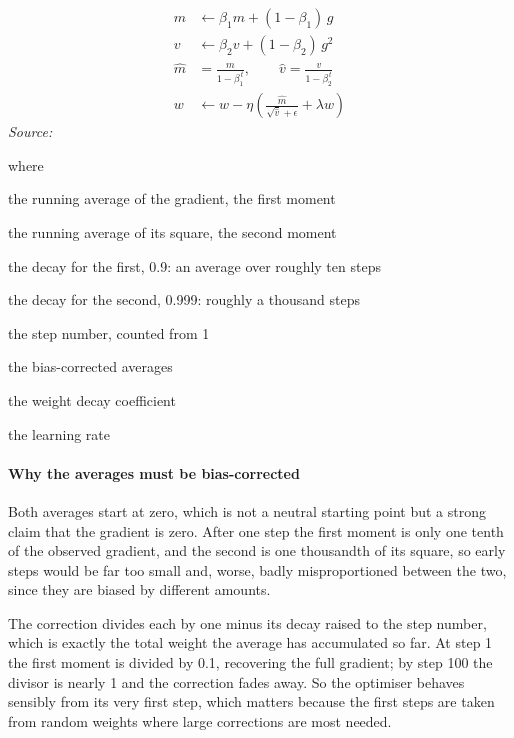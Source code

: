 \begin{equation}
\begin{aligned} m &\leftarrow \beta_1 m + (1-\beta_1)\,g \\[2pt] v &\leftarrow \beta_2 v + (1-\beta_2)\,g^2 \\[2pt] \hat{m} &= \frac{m}{1-\beta_1^{\,t}}, \qquad \hat{v} = \frac{v}{1-\beta_2^{\,t}} \\[2pt] w &\leftarrow w - \eta\left(\frac{\hat{m}}{\sqrt{\hat{v}}+\epsilon} + \lambda w\right) \end{aligned}
\end{equation}
\noindent\emph{Source: }\cite{kingma2015}


\noindent where
\begin{description}[leftmargin=2.4em,style=nextline,font=\normalfont\ttfamily]\setlength\itemsep{1pt}
  \item[{$m$}] \normalfont the running average of the gradient, the first moment
  \item[{$v$}] \normalfont the running average of its square, the second moment
  \item[{$\beta_1$}] \normalfont the decay for the first, 0.9: an average over roughly ten steps
  \item[{$\beta_2$}] \normalfont the decay for the second, 0.999: roughly a thousand steps
  \item[{$t$}] \normalfont the step number, counted from 1
  \item[{$\hat{m},\,\hat{v}$}] \normalfont the bias-corrected averages
  \item[{$\lambda$}] \normalfont the weight decay coefficient
  \item[{$\eta$}] \normalfont the learning rate
\end{description}

\paragraph{Why the averages must be bias-corrected}
Both averages start at zero, which is not a neutral starting point but a strong claim that the gradient is zero. After one step the first moment is only one tenth of the observed gradient, and the second is one thousandth of its square, so early steps would be far too small and, worse, badly misproportioned between the two, since they are biased by different amounts.

The correction divides each by one minus its decay raised to the step number, which is exactly the total weight the average has accumulated so far. At step 1 the first moment is divided by 0.1, recovering the full gradient; by step 100 the divisor is nearly 1 and the correction fades away. So the optimiser behaves sensibly from its very first step, which matters because the first steps are taken from random weights where large corrections are most needed.



